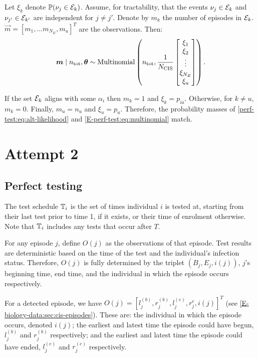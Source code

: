\documentclass[thesis.tex]{subfiles}
\begin{document}
Let $\xi_k$ denote $\operatorname{\mathbb{P}}(\nu_j \in \mathcal{E}_k)$.
Assume, for tractability, that the events $\nu_j \in \mathcal{E}_k$ and $\nu_{j'} \in \mathcal{E}_{k'}$ are independent for $j \neq j'$.
Denote by $m_k$ the number of episodes in $\mathcal{E}_k$.
$\vec{m} = [m_1, \dots m_{N_E}, m_u]^T$ are the observations.
Then:
\begin{align}
  \bm{m}
  \mid n_\text{tot}, \bm{\theta}
  \sim
  \operatorname{Multinomial}\left(
    n_\text{tot},
    \frac{1}{N_\text{CIS}}
    \begin{bmatrix}
        \xi_1 \\ \xi_2 \\ \vdots \\ \xi_{N_E} \\ \xi_u
    \end{bmatrix}
  \right).
  \label{perf-test:eq:alt-likelihood}
\end{align}

If the set $\mathcal{E}_k$ aligns with some $\alpha_i$ then $m_k = 1$ and $\xi_k = p_{ia}$.
Otherwise, for $k \neq u$, $m_k = 0$.
Finally, $m_u = n_u$ and $\xi_u = p_u$.
Therefore, the probability masses of \cref{perf-test:eq:alt-likelihood} and \cref{E-perf-test:eq:multinomial} match.



\section{Attempt 2}

\subsection{Perfect testing}

The test schedule $\mathbb{T}_i$ is the set of times individual $i$ is tested at, starting from their last test prior to time 1, if it exists, or their time of enrolment otherwise.
Note that $\mathbb{T}_i$ includes any tests that occur after $T$.

For any episode $j$, define $O(j)$ as the observations of that episode.
Test results are deterministic based on the time of the test and the individual's infection status.
Therefore, $O(j)$ is fully determined by the triplet $(B_j, E_j, i(j))$, $j$'s beginning time, end time, and the individual in which the episode occurs respectively.

For a detected episode, we have $O(j) = [l_j^{(b)}, r_j^{(b)}, l_j^{(e)}, r_j^{e}, i(j)]^T$ (see \cref{E-biology-data:sec:cis-episodes}).
These are: the individual in which the episode occurs, denoted $i(j)$; the earliest and latest time the episode could have begun, $l_j^{(b)}$ and $r_j^{(b)}$ respectively; and the earliest and latest time the episode could have ended, $l_j^{(e)}$ and $r_j^{(e)}$ respectively.
\end{document}
